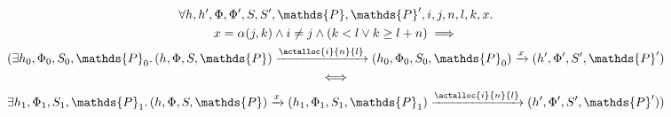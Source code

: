 \lem
\begin{gather*}
	\forall h, h', \Phi, \Phi', S, S', \mathds{P}, \mathds{P}', i, j, n, l, k, x \ldotp \\
	x = \alpha(j, k) \land i \neq j \land (k < l \lor k \geq l + n) \implies \\
	(\exists h_0, \Phi_0, S_0, \mathds{P}_0 \ldotp 
	(h, \Phi, S, \mathds{P}) \xrightarrow{\actalloc{i}{n}{l}} (h_0, \Phi_0, S_0, \mathds{P}_0)  \xrightarrow{x} (h', \Phi', S', \mathds{P}') \\
	\iff \\
	\exists h_1, \Phi_1, S_1, \mathds{P}_1 \ldotp
	(h, \Phi, S, \mathds{P}) \xrightarrow{x} (h_1, \Phi_1, S_1, \mathds{P}_1) \xrightarrow{\actalloc{i}{n}{l}} (h', \Phi', S', \mathds{P}'))
\end{gather*}
